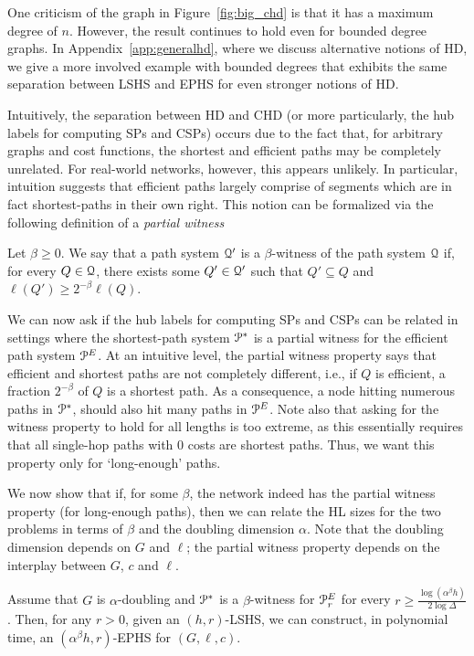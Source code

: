 \begin{remark}
One criticism of the graph in Figure~\ref{fig:big_chd} is that it has a maximum degree of $n$.
However, the result continues to hold even for bounded degree graphs.
In Appendix~\ref{app:generalhd}, where we discuss alternative notions of HD, we give a more involved example with bounded degrees that exhibits the same separation between LSHS and EPHS for even stronger notions of HD.
\end{remark}

Intuitively, the separation between HD and CHD (or more particularly, the hub labels for computing SPs and CSPs) occurs due to the fact that, for arbitrary graphs and cost functions, the shortest and efficient paths may be completely unrelated. 
For real-world networks, however, this appears unlikely.
In particular, intuition suggests that efficient paths largely comprise of segments which are in fact shortest-paths in their own right. 
This notion can be formalized via the following definition of a \emph{partial witness} 
\begin{definition}
Let $\beta\geq 0$.
We say that a path system $\mathcal{Q}'$ is a $\beta$-witness of the path system $\mathcal{Q}$ if, for every $Q\in\mathcal{Q}$, there exists some $Q'\in\mathcal{Q}'$ such that $Q'\subseteq Q$ and $\ell(Q')\geq 2^{-\beta}\ell(Q)$.
\end{definition}
We can now ask if the hub labels for computing SPs and CSPs can be related in settings where the shortest-path system $\mathcal{P}^*$ is a partial witness for the efficient path system $\mathcal{P}^E$.
At an intuitive level, the partial witness property says that efficient and shortest paths are not completely different, i.e., if $Q$ is efficient, a fraction $2^{-\beta}$ of $Q$ is a shortest path.
As a consequence, a node hitting numerous paths in $\mathcal{P}^*$, should also hit many paths in $\mathcal{P}^E$.
Note also that asking for the witness property to hold for all lengths is too extreme, as this essentially requires that all single-hop paths with 0 costs are shortest paths.
Thus, we want this property only for `long-enough' paths. 

We now show that if, for some $\beta$, the network indeed has the partial witness property (for long-enough paths), then we can relate the HL sizes for the two problems in terms of $\beta$ and the doubling dimension $\alpha$. 
Note that the doubling dimension depends on $G$ and $\ell$; the partial witness property depends on the interplay between $G$, $c$ and $\ell$.
\begin{theorem}\label{theo:witness_doubling}
Assume that $G$ is $\alpha$-doubling and $\mathcal{P}^*$ is a $\beta$-witness for $\mathcal{P}^E_r$ for every $r\geq \frac{\log(\alpha^\beta h)}{2\log\Delta}$. 
Then, for any $r>0$, given an $(h,r)$-LSHS, we can construct, in polynomial time, an $(\alpha^{\beta} h,r)$-EPHS for $(G,\ell,c)$. 
\end{theorem}

